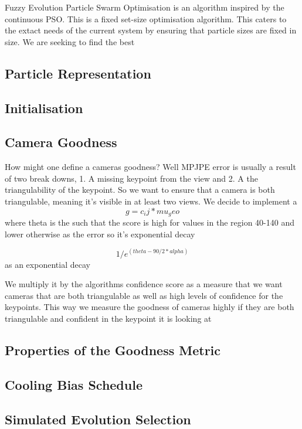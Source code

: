 Fuzzy Evolution Particle Swarm Optimisation is an algorithm inspired by the continuous PSO. This is a fixed set-size optimisation algorithm. This caters to the extact needs of the current system by ensuring that particle sizes are fixed in size. We are seeking to find the best

\subsection{Particle Representation}

\subsection{Initialisation}

\subsection{Camera Goodness}

How might one define a cameras goodness? Well MPJPE error is usually a result of two break downs, 1. A missing keypoint from the view and 2. A the triangulability of the keypoint. So we want to ensure that a camera is both triangulable, meaning it's visible in at least two views. 
We decide to implement a $$g = c_ij * mu_geo$$ where theta is the such that the score is high for values in the region 40-140 and lower otherwise as the error so it's exponential decay

$$1/e^(theta-90/2*alpha)$$ as an exponential decay 

We multiply it by the algorithms confidence score as a measure that we want cameras that are both triangulable as well as high levels of confidence for the keypoints.
This way we measure the goodness of cameras highly if they are both triangulable and confident in the keypoint it is looking at 
\subsection{Properties of the Goodness Metric}

\subsection{Cooling Bias Schedule}

\subsection{Simulated Evolution Selection}

